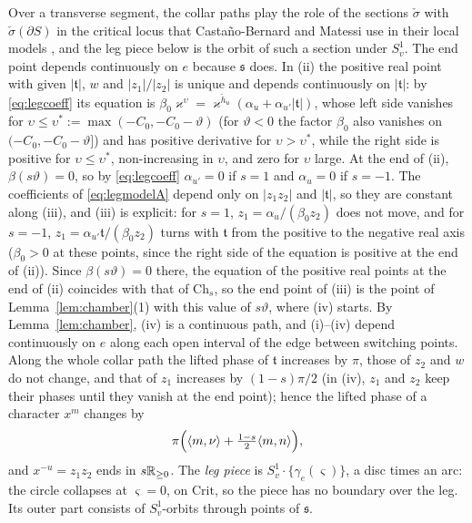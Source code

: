 Over a transverse segment, the collar paths play the role of the sections $\check\sigma$ with $\check\sigma(\partial S)$ in the
critical locus that Casta\~no-Bernard and Matessi use in their local models \cite[\S7.2, (47)--(48), \S7.4, \S7.5]{CBM}, and the leg piece below is
the orbit of such a section under $S^1_v$. The end point depends continuously on $e$ because $\mathfrak s$ does. In (ii) the positive real point with given
$|\mathfrak t|$, $w$ and $|z_1|/|z_2|$ is unique and depends continuously on $|\mathfrak t|$: by \eqref{eq:legcoeff} its
equation is $\beta_0\varkappa^\upsilon=\varkappa^{\check h_u}(\alpha_u+\alpha_{u'}|\mathfrak t|)$, whose left side vanishes for
$\upsilon\le\upsilon^*:=\max(-C_0,-C_0-\vartheta)$ (for $\vartheta<0$ the factor $\beta_0$ also vanishes on $(-C_0,-C_0-\vartheta]$) and
has positive derivative for $\upsilon>\upsilon^*$, while the right side is positive for $\upsilon\le\upsilon^*$, non-increasing in $\upsilon$, and zero
for $\upsilon$ large. At the end of (ii), $\beta(s\vartheta)=0$, so by \eqref{eq:legcoeff} $\alpha_{u'}=0$ if
$s=1$ and $\alpha_u=0$ if $s=-1$. The coefficients of \eqref{eq:legmodelA} depend only on $|z_1z_2|$ and
$|\mathfrak t|$, so they are constant along (iii), and (iii) is explicit: for $s=1$, $z_1=\alpha_u/(\beta_0z_2)$ does
not move, and for $s=-1$, $z_1=\alpha_{u'}\mathfrak t/(\beta_0z_2)$ turns with $\mathfrak t$ from the positive to the
negative real axis ($\beta_0>0$ at these points, since the right side of the equation is positive at the end of (ii)). Since
$\beta(s\vartheta)=0$ there, the equation of the positive real points at the end of (ii) coincides with that of
$\mathrm{Ch}_s$, so the end point of (iii) is the point of Lemma~\ref{lem:chamber}(1) with this value of
$s\vartheta$, where (iv) starts. By Lemma~\ref{lem:chamber}, (iv) is a continuous path, and (i)--(iv) depend
continuously on $e$ along each open interval of the edge between switching points. Along the whole collar path the lifted phase
of $\mathfrak t$ increases by $\pi$, those of $z_2$ and $w$ do not change, and that of $z_1$ increases by $(1-s)\pi/2$
(in (iv), $z_1$ and $z_2$ keep their phases until they vanish at the end point); hence the lifted phase of a character $x^m$
changes by
\begin{equation}\label{eq:collarphase}
\pi\Bigl(\langle m,\nu\rangle+\tfrac{1-s}{2}\langle m,n\rangle\Bigr),
\end{equation}
and $x^{-u}=z_1z_2$ ends in $s\mathbb R_{\ge0}$. The \emph{leg piece} is $S^1_v\cdot\{\gamma_e(\varsigma)\}$, a disc times an
arc: the circle collapses at $\varsigma=0$, on $\mathrm{Crit}$, so the piece has no boundary over the leg. Its outer part
consists of $S^1_v$-orbits through points of $\mathfrak s$.

